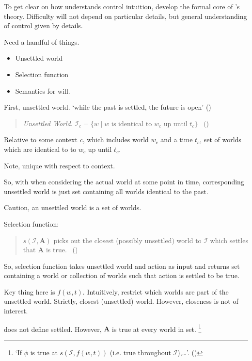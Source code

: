 \begin{note}
  To get clear on how \citeauthor{Boylan:2020aa} understands control intuition, develop the formal core of \citeauthor{Boylan:2020aa}'s theory.
  Difficulty will not depend on particular details, but general understanding of control given by details.

  Need a handful of things.
  \begin{itemize}
  \item
    Unsettled world
  \item
    Selection function
  \item
    Semantics for will.
  \end{itemize}

  First, unsettled world.
  `while the past is settled, the future is open' (\citeyear[1]{Boylan:2020aa})

  \begin{quote}
    \emph{Unsettled World}. \(\mathcal{I}_{c} = \{w \mid w\text{ is identical to }w_{c}\text{ up until }t_{c}\}\)%
    \mbox{ }\hfill\mbox{(\citeyear[11]{Boylan:2020aa})}
  \end{quote}
  Relative to some context \(c\), which includes world \(w_{c}\) and a time \(t_{c}\), set of worlds which are identical to to \(w_{c}\) up until \(t_{c}\).

  Note, unique with respect to context.

  So, with when considering the actual world at some point in time, corresponding unsettled world is just set containing all worlds identical to the past.

  Caution, an unsettled world is a set of worlds.

  Selection function:

  \begin{quote}
    \(s(\mathcal{I}, \mathbf{A})\) picks out the closest (possibly unsettled) world to \(\mathcal{I}\) which settles that \(\mathbf{A}\) is true.%
    \mbox{ }\hfill\mbox{(\citeyear[11]{Boylan:2020aa})}
  \end{quote}
  So, selection function takes unsettled world and action as input and returns set containing a world or collection of worlds such that action is settled to be true.

  Key thing here is \(f(w,t)\).
  Intuitively, restrict which worlds are part of the unsettled world.
  Strictly, closest (unsettled) world.
  However, closeness is not of interest.

  \citeauthor{Boylan:2020aa} does not define settled.
  However, \(\mathbf{A}\) is true at every world in set.%
  \footnote{
    `If \(\phi\) is true at \(s(\mathcal{I}, f(w,t))\) (i.e. true throughout \(\mathcal{I}\)),\dots'. \mbox{(\citeyear[12]{Boylan:2020aa})}
  }


\end{note}

